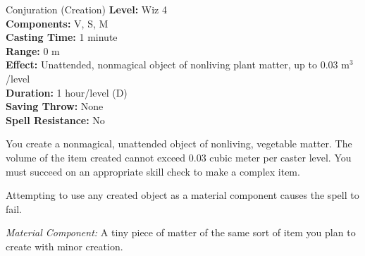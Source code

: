 {Conjuration (Creation)}
{
	\textbf{Level:}
	Wiz 4\\
	\textbf{Components:}
	V, S, M\\
	\textbf{Casting Time:}
	1 minute\\
	\textbf{Range:}
	0 m\\
	\textbf{Effect:}
	Unattended, nonmagical object of nonliving plant matter, up to 0.03 m$^3$/level\\
	\textbf{Duration:}
	1 hour/level (D)\\
	\textbf{Saving Throw:}
	None\\
	\textbf{Spell Resistance:}
	No\\
}
{
	You create a nonmagical, unattended object of nonliving, vegetable matter. The volume of the item created cannot exceed 0.03 cubic meter per caster level. You must succeed on an appropriate skill check to make a complex item.

	Attempting to use any created object as a material component causes the spell to fail.

	\textit{Material Component:}
	A tiny piece of matter of the same sort of item you plan to create with minor creation.

}
